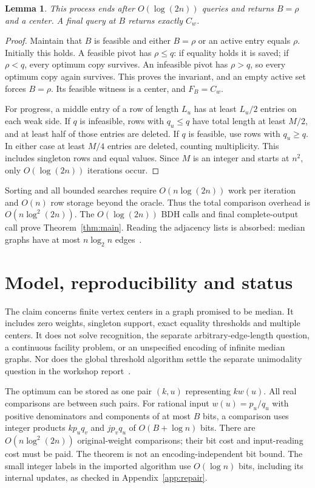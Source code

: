 \documentclass[11pt]{article}
\newtheorem{lemma}[theorem]{Lemma}
\begin{document}
\begin{lemma}\label{lem:search}
This process ends after $O(\log(2n))$ queries and returns $B=\rho$ and a
center. A final query at $B$ returns exactly $C_w$.
\end{lemma}
\begin{proof}
Maintain that $B$ is feasible and either $B=\rho$ or an active entry
equals $\rho$. Initially this holds. A feasible pivot has $\rho\leq q$:
if equality holds it is saved; if $\rho<q$, every optimum copy survives.
An infeasible pivot has $\rho>q$, so every optimum copy again survives.
This proves the invariant, and an empty active set forces $B=\rho$.
Its feasible witness is a center, and $F_B=C_w$.

For progress, a middle entry of a row of length $L_u$ has at least
$L_u/2$ entries on each weak side. If $q$ is infeasible, rows with
$q_u\leq q$ have total length at least $M/2$, and at least half of
those entries are deleted. If $q$ is feasible, use rows with $q_u\geq q$.
In either case at least $M/4$ entries are deleted, counting multiplicity.
This includes singleton rows and equal values. Since $M$ is an integer
and starts at $n^2$, only $O(\log(2n))$ iterations occur.
\end{proof}

Sorting and all bounded searches require $O(n\log(2n))$ work per
iteration and $O(n)$ row storage beyond the oracle. Thus the total
comparison overhead is $O(n\log^2(2n))$. The
$O(\log(2n))$ BDH calls and final complete-output call prove
Theorem~\ref{thm:main}. Reading the adjacency lists is absorbed: median
graphs have at most $n\log_2 n$ edges~\cite{BDHarxiv}.

\section{Model, reproducibility and status}
The claim concerns finite vertex centers in a graph promised to be
median. It includes zero weights, singleton support, exact equality
thresholds and multiple centers. It does not solve recognition, the
separate arbitrary-edge-length question, a continuous facility problem,
or an unspecified encoding of infinite median graphs. Nor does the
global threshold algorithm settle the separate unimodality question in
the workshop report~\cite{OWR}.

The optimum can be stored as one pair $(k,u)$ representing $k w(u)$.
All real comparisons are between such pairs. For rational input
$w(u)=p_u/q_u$ with positive denominators and components of at most $B$
bits, a comparison uses integer products $k p_u q_v$ and $j p_v q_u$
of $O(B+\log n)$ bits. There are $O(n\log^2(2n))$ original-weight
comparisons; their bit cost and input-reading cost must be paid.
The theorem is not an encoding-independent bit bound. The small
integer labels in the imported algorithm use $O(\log n)$ bits, including
its internal updates, as checked in Appendix~\ref{app:repair}.
\end{document}
